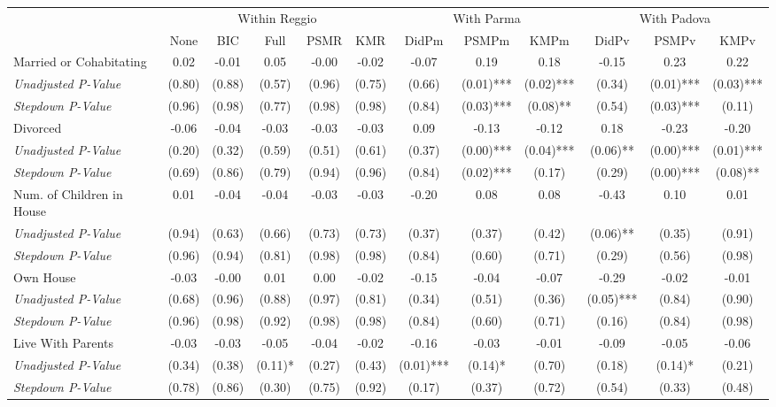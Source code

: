\begin{tabular}{l c c c c c c c c c c c}
\toprule
& \multicolumn{5}{c}{Within Reggio} & \multicolumn{3}{c}{With Parma} & \multicolumn{3}{c}{With Padova} \\\cmidrule(lr){2-6} \cmidrule(lr){7-9} \cmidrule(lr){10-12}
 & None & BIC & Full & PSMR & KMR & DidPm & PSMPm & KMPm & DidPv & PSMPv & KMPv \\
\midrule
Married or Cohabitating & 0.02 & -0.01 & 0.05 & -0.00 & -0.02 & -0.07 & 0.19 & 0.18 & -0.15 & 0.23 & 0.22 \\
\quad \textit{Unadjusted P-Value} & (0.80) & (0.88) & (0.57) & (0.96) & (0.75) & (0.66) & (0.01)*** & (0.02)*** & (0.34) & (0.01)*** & (0.03)*** \\
\quad \textit{Stepdown P-Value} & (0.96) & (0.98) & (0.77) & (0.98) & (0.98) & (0.84) & (0.03)*** & (0.08)** & (0.54) & (0.03)*** & (0.11) \\
Divorced & -0.06 & -0.04 & -0.03 & -0.03 & -0.03 & 0.09 & -0.13 & -0.12 & 0.18 & -0.23 & -0.20 \\
\quad \textit{Unadjusted P-Value} & (0.20) & (0.32) & (0.59) & (0.51) & (0.61) & (0.37) & (0.00)*** & (0.04)*** & (0.06)** & (0.00)*** & (0.01)*** \\
\quad \textit{Stepdown P-Value} & (0.69) & (0.86) & (0.79) & (0.94) & (0.96) & (0.84) & (0.02)*** & (0.17) & (0.29) & (0.00)*** & (0.08)** \\
Num. of Children in House & 0.01 & -0.04 & -0.04 & -0.03 & -0.03 & -0.20 & 0.08 & 0.08 & -0.43 & 0.10 & 0.01 \\
\quad \textit{Unadjusted P-Value} & (0.94) & (0.63) & (0.66) & (0.73) & (0.73) & (0.37) & (0.37) & (0.42) & (0.06)** & (0.35) & (0.91) \\
\quad \textit{Stepdown P-Value} & (0.96) & (0.94) & (0.81) & (0.98) & (0.98) & (0.84) & (0.60) & (0.71) & (0.29) & (0.56) & (0.98) \\
Own House & -0.03 & -0.00 & 0.01 & 0.00 & -0.02 & -0.15 & -0.04 & -0.07 & -0.29 & -0.02 & -0.01 \\
\quad \textit{Unadjusted P-Value} & (0.68) & (0.96) & (0.88) & (0.97) & (0.81) & (0.34) & (0.51) & (0.36) & (0.05)*** & (0.84) & (0.90) \\
\quad \textit{Stepdown P-Value} & (0.96) & (0.98) & (0.92) & (0.98) & (0.98) & (0.84) & (0.60) & (0.71) & (0.16) & (0.84) & (0.98) \\
Live With Parents & -0.03 & -0.03 & -0.05 & -0.04 & -0.02 & -0.16 & -0.03 & -0.01 & -0.09 & -0.05 & -0.06 \\
\quad \textit{Unadjusted P-Value} & (0.34) & (0.38) & (0.11)* & (0.27) & (0.43) & (0.01)*** & (0.14)* & (0.70) & (0.18) & (0.14)* & (0.21) \\
\quad \textit{Stepdown P-Value} & (0.78) & (0.86) & (0.30) & (0.75) & (0.92) & (0.17) & (0.37) & (0.72) & (0.54) & (0.33) & (0.48) \\
\bottomrule
\end{tabular}
